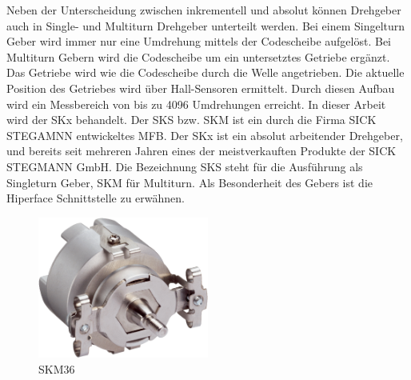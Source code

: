 Neben der Unterscheidung zwischen inkrementell und absolut können Drehgeber auch in Single- und Multiturn Drehgeber unterteilt werden. Bei einem Singelturn Geber wird immer nur eine Umdrehung mittels der Codescheibe aufgelöst. Bei Multiturn Gebern wird die Codescheibe um ein untersetztes Getriebe ergänzt. Das Getriebe wird wie die Codescheibe durch die Welle angetrieben. Die aktuelle Position des Getriebes wird über Hall-Sensoren ermittelt. Durch diesen Aufbau wird ein Messbereich von bis zu 4096 Umdrehungen erreicht. \cite{Basler.2016} 
	In dieser Arbeit wird der SKx behandelt. Der SKS bzw. SKM ist ein durch die Firma SICK STEGAMNN entwickeltes \ac{MFB}. Der SKx ist ein absolut arbeitender Drehgeber, und bereits seit mehreren Jahren eines der meistverkauften Produkte der SICK STEGMANN GmbH. Die Bezeichnung SKS steht für die Ausführung als Singleturn Geber, SKM für Multiturn. Als Besonderheit des Gebers ist die Hiperface Schnittstelle zu erwähnen.
	\begin{figure}[h]
        \centering
        \includegraphics[width=0.5\textwidth]{img/SKM36.png} 
        \caption[SKM36]{ SKM36 \cite{SICKAG.2021}}
        \label{fig:SKM36.jpg}
    \end{figure}
    \newline
\newpage

